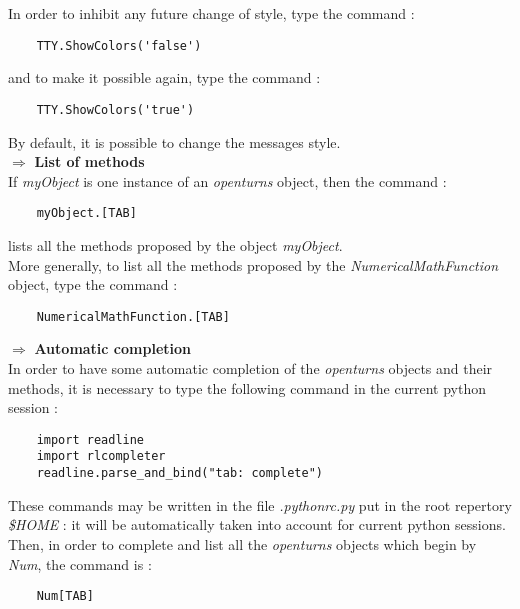 In order to inhibit any future change of style, type the command : 
\begin{center}
  \begin{lstlisting}
    TTY.ShowColors('false')
  \end{lstlisting}
\end{center}
and to make it possible again, type the command :
\begin{center}
  \begin{lstlisting}
    TTY.ShowColors('true')
  \end{lstlisting}
\end{center}
By default, it is possible to change the messages style.\\

$\boldsymbol{\Longrightarrow}$ {\bf List of methods}\\

If {\itshape myObject} is one instance of an {\itshape openturns} object, then the command :
\begin{center}
  \begin{lstlisting}
    myObject.[TAB]
  \end{lstlisting}
\end{center}
lists all the methods proposed by the object {\itshape myObject}.\\

More generally, to list all the methods proposed by the {\itshape NumericalMathFunction} object, type the command :
\begin{center}
  \begin{lstlisting}
    NumericalMathFunction.[TAB]
  \end{lstlisting}
\end{center}


{$\boldsymbol{\Longrightarrow}$ \bf Automatic completion}\\

In order to have some automatic completion of the {\itshape openturns} objects and their methods, it is necessary to type the following command in the current python session :
\begin{center}
  \begin{lstlisting}
    import readline
    import rlcompleter
    readline.parse_and_bind("tab: complete")
  \end{lstlisting}
\end{center}

These commands may be written in the file {\itshape .pythonrc.py} put in the root repertory {\itshape \$HOME} : it will be automatically taken into account  for current python sessions.\\
Then, in order to complete and list all the {\itshape openturns} objects which begin by {\itshape Num}, the command is :
\begin{center}
  \begin{lstlisting}
    Num[TAB]
  \end{lstlisting}
\end{center}

